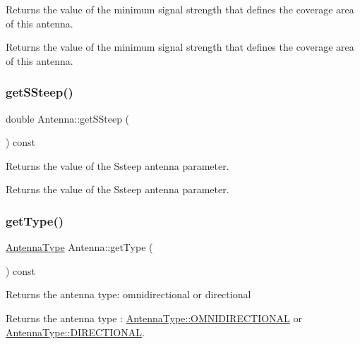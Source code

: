 Returns the value of the minimum signal strength that defines the coverage area of this antenna. \begin{DoxyReturn}{Returns}
the value of the minimum signal strength that defines the coverage area of this antenna. 
\end{DoxyReturn}
\mbox{\label{class_antenna_a096deca0fe8497c0fe53539ae80f2db5}} 
\subsubsection{\texorpdfstring{get\+S\+Steep()}{getSSteep()}}
{\footnotesize\ttfamily double Antenna\+::get\+S\+Steep (\begin{DoxyParamCaption}{ }\end{DoxyParamCaption}) const}

Returns the value of the Ssteep antenna parameter. \begin{DoxyReturn}{Returns}
the value of the Ssteep antenna parameter. 
\end{DoxyReturn}
\mbox{\label{class_antenna_adf45a8b339956741bf8dcb5361f5f249}} 
\subsubsection{\texorpdfstring{get\+Type()}{getType()}}
{\footnotesize\ttfamily \hyperlink{_antenna_type_8h_a7b678b5cb9dedc607131200119d96b16}{Antenna\+Type} Antenna\+::get\+Type (\begin{DoxyParamCaption}{ }\end{DoxyParamCaption}) const}

Returns the antenna type\+: omnidirectional or directional \begin{DoxyReturn}{Returns}
the antenna type \+: \hyperlink{_antenna_type_8h_a7b678b5cb9dedc607131200119d96b16a8ff57fa72952e98025e600a041b8b8de}{Antenna\+Type\+::\+O\+M\+N\+I\+D\+I\+R\+E\+C\+T\+I\+O\+N\+AL} or \hyperlink{_antenna_type_8h_a7b678b5cb9dedc607131200119d96b16ab6f2249394a4def60a78b342dcc925b9}{Antenna\+Type\+::\+D\+I\+R\+E\+C\+T\+I\+O\+N\+AL}. 
\end{DoxyReturn}
\mbox{\label{class_antenna_a8270b1a03b61af1e048650e00a129b93}} 
